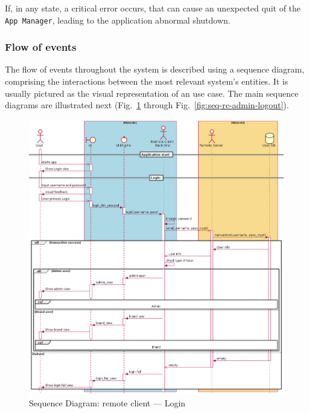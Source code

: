 If, in any state, a critical error occurs, that can cause an unexpected quit of the
\texttt{App Manager}, leading to the application abnormal shutdown.
%
%
%

\subsubsection{Flow of events}
\label{sec:flow-events-1}
The flow of events throughout the system is described using a sequence diagram, comprising the interactions between the most relevant system's entities.
It is usually pictured as the visual representation of an use case. The main
sequence diagrams are illustrated next (Fig.~\ref{fig:seq-rc-login} through Fig.~\ref{fig:seq-rc-admin-logout}).

\begin{figure}[htb!]
\centering
    \includegraphics[width=1\columnwidth]{./img/seq-rc-login.png}
  \caption{Sequence Diagram: remote client --- Login}%
\label{fig:seq-rc-login}
\end{figure}

